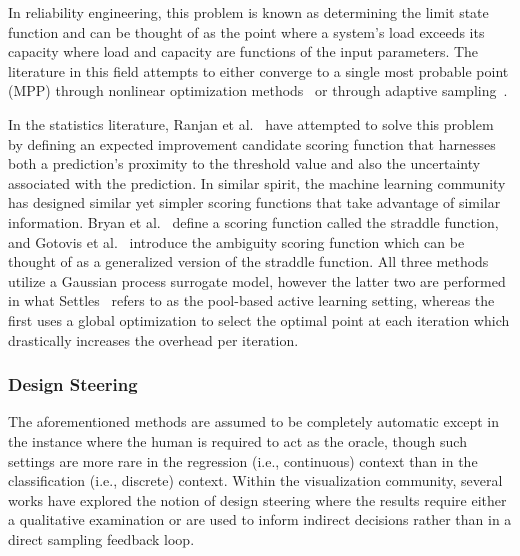 In reliability engineering, this problem is known as determining the limit state function and can be thought of as the point where a system's load exceeds its capacity where load and capacity are functions of the input parameters.
%
The literature in this field attempts to either converge to a single most probable point (MPP) through nonlinear optimization methods~\cite{EldredBichon2006,EldredAgarwalPerez2007} or through adaptive sampling~\cite{Wu1994,DeyMahadevan1998,ZouMahadevanMourelatos2002,BichonEldredSwiler2008}.

In the statistics literature, Ranjan et al.~\cite{RanjanBinghamMichailidis2008} have attempted to solve this problem by defining an expected improvement candidate scoring function that harnesses both a prediction's proximity to the threshold value and also the uncertainty associated with the prediction.
%
In similar spirit, the machine learning community has designed similar yet simpler scoring functions that take advantage of similar information.
%
Bryan et al.~\cite{BryanSchneiderNichol2005} define a scoring function called the straddle function, and Gotovis et al.~\cite{GotovosCasatiHitz2013} introduce the ambiguity scoring function which can be thought of as a generalized version of the straddle function.
%
All three methods utilize a Gaussian process surrogate model, however the latter two are performed in what Settles~\cite{Settles2009} refers to as the pool-based active learning setting, whereas the first uses a global optimization to select the optimal point at each iteration which drastically increases the overhead per iteration.

\subsubsection{Design Steering}
\label{sec:designSteering}

The aforementioned methods are assumed to be completely automatic except in the instance where the human is required to act as the oracle, though such settings are more rare in the regression (i.e., continuous) context than in the classification (i.e., discrete) context.
%
%
%
Within the visualization community, several works have explored the notion of design steering where the results require either a qualitative examination or are used to inform indirect decisions rather than in a direct sampling feedback loop.

